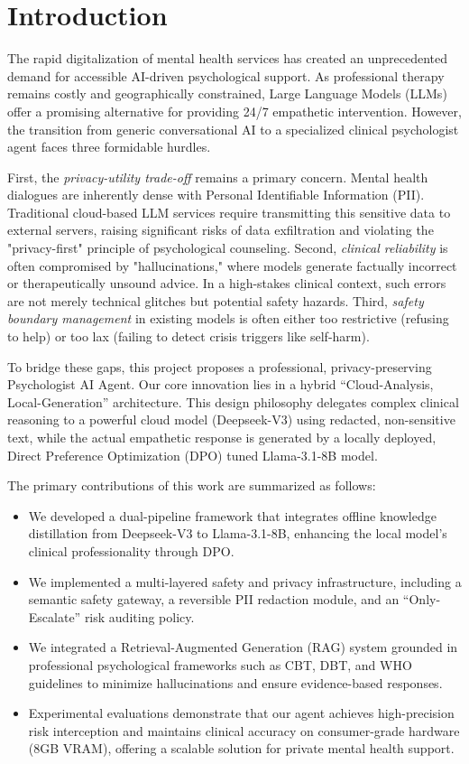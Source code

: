 \documentclass[conference]{IEEEtran}
\begin{document}
\section{Introduction}

The rapid digitalization of mental health services has created an unprecedented demand for accessible AI-driven psychological support. As professional therapy remains costly and geographically constrained, Large Language Models (LLMs) offer a promising alternative for providing 24/7 empathetic intervention. However, the transition from generic conversational AI to a specialized clinical psychologist agent faces three formidable hurdles.

First, the \textit{privacy-utility trade-off} remains a primary concern. Mental health dialogues are inherently dense with Personal Identifiable Information (PII). Traditional cloud-based LLM services require transmitting this sensitive data to external servers, raising significant risks of data exfiltration and violating the "privacy-first" principle of psychological counseling. Second, \textit{clinical reliability} is often compromised by "hallucinations," where models generate factually incorrect or therapeutically unsound advice. In a high-stakes clinical context, such errors are not merely technical glitches but potential safety hazards. Third, \textit{safety boundary management} in existing models is often either too restrictive (refusing to help) or too lax (failing to detect crisis triggers like self-harm).

To bridge these gaps, this project proposes a professional, privacy-preserving Psychologist AI Agent. Our core innovation lies in a hybrid ``Cloud-Analysis, Local-Generation'' architecture. This design philosophy delegates complex clinical reasoning to a powerful cloud model (Deepseek-V3) using redacted, non-sensitive text, while the actual empathetic response is generated by a locally deployed, Direct Preference Optimization (DPO) tuned Llama-3.1-8B model. 

The primary contributions of this work are summarized as follows:
\begin{itemize}
    \item We developed a dual-pipeline framework that integrates offline knowledge distillation from Deepseek-V3 to Llama-3.1-8B, enhancing the local model's clinical professionality through DPO.
    \item We implemented a multi-layered safety and privacy infrastructure, including a semantic safety gateway, a reversible PII redaction module, and an ``Only-Escalate'' risk auditing policy.
    \item We integrated a Retrieval-Augmented Generation (RAG) system grounded in professional psychological frameworks such as CBT, DBT, and WHO guidelines to minimize hallucinations and ensure evidence-based responses.
    \item Experimental evaluations demonstrate that our agent achieves high-precision risk interception and maintains clinical accuracy on consumer-grade hardware (8GB VRAM), offering a scalable solution for private mental health support.
\end{itemize}
\end{document}
